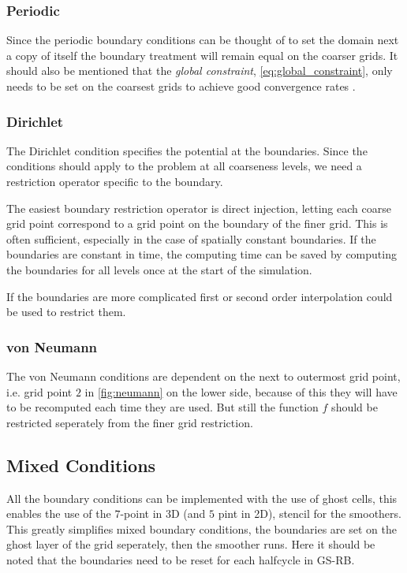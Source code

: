 	\subsubsection{Periodic}
		Since the periodic boundary conditions can be thought of to set the domain next
		a copy of itself the boundary treatment will remain equal on the coarser
		grids. It should also be mentioned that the \textit{global constraint}, \cref{eq:global_constraint},
		only needs to be set on the coarsest grids to achieve good convergence
		rates \citep{trottenberg_multigrid_2000}.

	\subsubsection{Dirichlet}
		The Dirichlet condition specifies the potential at the boundaries. Since the conditions
		should apply to the problem at all coarseness levels, we need a restriction
		operator specific to the boundary.

		The easiest boundary restriction operator is direct injection, letting each
		coarse grid point correspond to a grid point on the boundary of the finer grid.
		This is often sufficient, especially in the case of spatially constant boundaries.
		If the boundaries are constant in time, the computing time can be saved by computing the boundaries for all levels
		once at the start of the simulation.

		If the boundaries are more complicated first or second order interpolation
		could be used to restrict them.

	\subsubsection{von Neumann}
		The von Neumann conditions are dependent on the next to outermost grid point,
		i.e. grid point \(2\) in \cref{fig:neumann} on the lower side,
		because of this they will have to be recomputed each time they are used.
		But still the function \(f\) should be restricted seperately from the
		finer grid restriction.


	\subsection{Mixed Conditions}
		All the boundary conditions can be implemented with the use of ghost cells,
		this enables the use of the \(7\)-point in 3D (and \(5\) pint in 2D), stencil for the smoothers. This
		greatly simplifies mixed boundary conditions, the boundaries are set on the
		ghost layer of the grid seperately, then the smoother runs. Here it should
		be noted that the boundaries need to be reset for each halfcycle in GS-RB.

